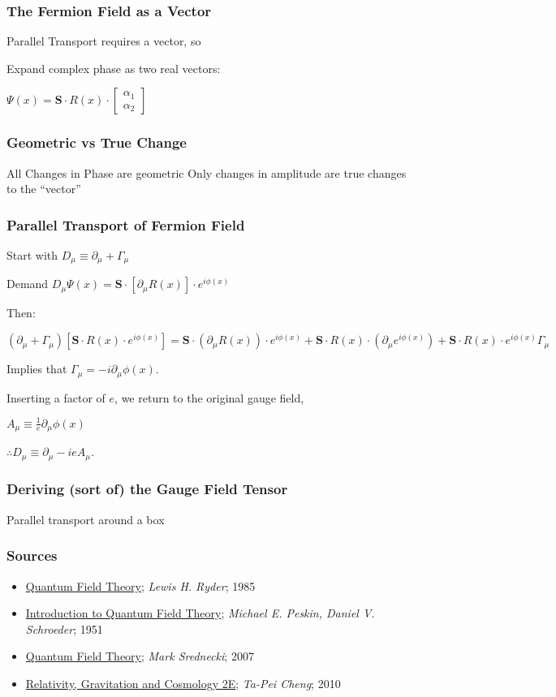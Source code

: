 \documentclass[12pt]{beamer}
\begin{document}
\begin{frame}
\frametitle{The Fermion Field as a Vector}
        Parallel Transport requires a vector, so

        Expand complex phase as two real vectors:
        \vfill

        $\Psi(x) = \mathbf{S} \cdot R(x) \cdot
        \begin{bmatrix} \alpha_1\\ \alpha_2 \end{bmatrix} $ 
\end{frame}

\begin{frame}
\frametitle{Geometric vs True Change}
        All Changes in Phase are geometric
        \vfill
        Only changes in amplitude are true changes to the ``vector''
\end{frame}

\begin{frame}
\frametitle{Parallel Transport of Fermion Field}
        Start with $ D_\mu \equiv \partial_\mu + \Gamma_\mu $

        Demand
        $D_\mu \Psi(x) = \mathbf{S} \cdot [\partial_\mu R(x) ] \cdot e^{i\phi(x)} $

        Then: \vfill
        
        $ (\partial_\mu + \Gamma_\mu) [  \mathbf{S} \cdot R(x) \cdot e^{i\phi(x)} ]
                = \mathbf{S} \cdot (\partial_\mu R(x) ) \cdot e^{i\phi(x)} + 
                \mathbf{S} \cdot  R(x)  \cdot (\partial_\mu e^{i\phi(x)}) +
                \mathbf{S} \cdot  R(x)  \cdot e^{i\phi(x)} \Gamma_\mu $

        \vfill
        Implies that $\Gamma_\mu = - i \partial_\mu \phi(x) $. 
        \vfill
        
        Inserting a factor of $e$, we return to the original gauge field,

        $A_\mu \equiv \frac{1}{e} \partial_\mu \phi(x)$ 
        
        \vfill
        $\therefore D_\mu \equiv \partial_\mu - i e A_\mu $.
\end{frame}

\begin{frame}
\frametitle{Deriving (sort of) the Gauge Field Tensor}
        Parallel transport around a box


\end{frame}

\begin{frame}
\frametitle{Sources}
        \begin{itemize}
                \item \underline{Quantum Field Theory}; \textit{Lewis H. Ryder}; 1985 \vfill
                \item \underline{Introduction to Quantum Field Theory}; \textit{Michael E. Peskin, Daniel V. Schroeder}; 1951 \vfill
                \item \underline{Quantum Field Theory}; \textit{Mark Srednecki}; 2007 \vfill
                \item \underline{Relativity, Gravitation and Cosmology 2E}; \textit{Ta-Pei Cheng}; 2010 \vfill
        \end{itemize}
\end{frame}
\end{document}
